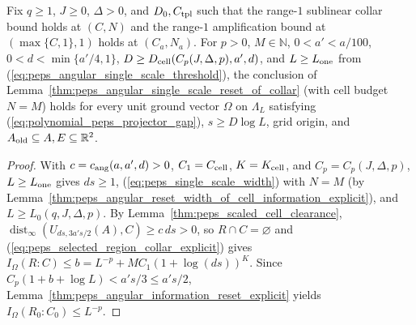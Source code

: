 \begin{lemma}
    \label{thm:peps_angular_single_scale_reset_of_collar_explicit}
    \leanok
    Fix $q\ge1$, $J\ge0$, $\Delta>0$, and $D_0,C_{\rm tpl}$ such that the range-$1$ sublinear collar
    bound holds at $(C,N)$ and the range-$1$ amplification bound at $(\max\{C,1\},1)$ holds at $(C_a,N_a)$.
    For $p>0$, $M\in\mathbb N$, $0<a'<a/100$, $0<d<\min\{a'/4,1\}$,
    $D\ge D_{\rm cell}(C_p(J,\Delta,p),a',d)$, and $L\ge L_{\rm one}$ from (\ref{eq:peps_angular_single_scale_threshold}),
    the conclusion of Lemma~\ref{thm:peps_angular_single_scale_reset_of_collar} (with cell budget $N=M$) holds for every unit ground vector $\Omega$ on $\Lambda_L$ satisfying (\ref{eq:polynomial_peps_projector_gap}), $s\ge D\log L$, grid origin, and $A_{\rm old}\subseteq A,E\subseteq\mathbb R^2$.
\end{lemma}
\begin{proof}\leanok
    With $c=c_{\rm ang}(a,a',d)>0$, $C_1=C_{\rm cell}$, $K=K_{\rm cell}$, and $C_p=C_p(J,\Delta,p)$, $L\ge L_{\rm one}$ gives $ds\ge1$, (\ref{eq:peps_single_scale_width}) with $N=M$ (by Lemma~\ref{thm:peps_angular_reset_width_of_cell_information_explicit}), and $L\ge L_0(q,J,\Delta,p)$. By Lemma~\ref{thm:peps_scaled_cell_clearance}, $\operatorname{dist}_\infty(U_{ds,3a's/2}(A),C)\ge c\,ds>0$, so $R\cap C=\varnothing$ and (\ref{eq:peps_selected_region_collar_explicit}) gives $I_\Omega(R:C)\le b=L^{-p}+MC_1(1+\log(ds))^K$. Since $C_p(1+b+\log L)<a's/3\le a's/2$, Lemma~\ref{thm:peps_angular_information_reset_explicit} yields $I_\Omega(R_0:C_0)\le L^{-p}$.
\end{proof}

